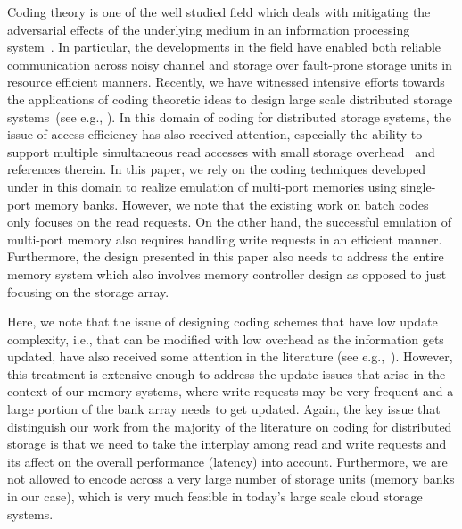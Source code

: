 Coding theory is one of the well studied field which deals with mitigating the adversarial effects of the underlying medium in an information processing system~\cite{MacSlo, Cover}. In particular, the developments in the field have enabled both reliable communication across noisy channel and storage over fault-prone storage units in resource efficient manners. Recently, we have witnessed intensive efforts towards the applications of coding theoretic ideas to design large scale distributed storage systems~(see e.g., \cite{Azure, SAPDVCB13, Rashmi14}). In this domain of coding for distributed storage systems, the issue of access efficiency has also received attention, especially the ability to support multiple simultaneous read accesses with small storage overhead~\cite{batchcodes, RPDV16, RSDG16, Wang2017} and references therein. In this paper, we rely on the coding techniques developed under in this domain to realize emulation of multi-port memories using single-port memory banks. However, we note that the existing work on batch codes~\cite{batchcodes} only focuses on the read requests. On the other hand, the successful emulation of multi-port memory also requires handling write requests in an efficient manner. Furthermore, the design presented in this paper also needs to address the entire memory system which also involves memory controller design as opposed to just focusing on the storage array. 

Here, we note that the issue of designing coding schemes that have low update complexity, i.e., that can be modified with low overhead as the information gets updated, have also received some attention in the literature (see e.g.,~\cite{ASV10, MCW14}). However, this treatment is extensive enough to address the update issues that arise in the context of our memory systems, where write requests may be very frequent and a large portion of the bank array needs to get updated. Again, the key issue that distinguish our work from the majority of the literature on coding for distributed storage is that we need to take the interplay among read and write requests and its affect on the overall performance (latency) into account. Furthermore, we  are not allowed to encode across a very large number of storage units (memory banks in our case), which is very much feasible in today's large scale cloud storage systems.

